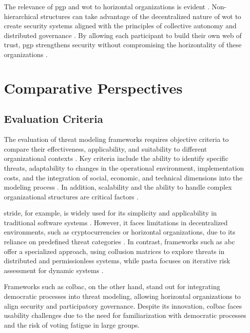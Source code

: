 The relevance of \gls{pgp} and \gls{wot} to horizontal organizations is evident
\cite{Colbac}. Non-hierarchical structures can take advantage of the
decentralized nature of \gls{wot} to create security systems aligned with the
principles of collective autonomy and distributed governance . By allowing each
participant to build their own web of trust, \gls{pgp} strengthens security
without compromising the horizontality of these organizations
\cite{EverydayRevolutions, Colbac}.

\section{Comparative Perspectives}
\label{sec:comparative_perspectives}

\subsection{Evaluation Criteria}
\label{subsec:evaluation_criteria}

The evaluation of threat modeling frameworks requires objective criteria to
compare their effectiveness, applicability, and suitability to different
organizational contexts \cite{EvaluationofCompetingThreatModeling}. Key criteria
include the ability to identify specific threats, adaptability to changes in the
operational environment, implementation costs, and the integration of social,
economic, and technical dimensions into the modeling process
\cite{ThreatModelingASystematicLiteratureReview}. In addition, scalability and
the ability to handle complex organizational structures are critical factors
\cite{AbcCrypto}.

\gls{stride}, for example, is widely used for its simplicity and applicability
in traditional software systems \cite{ThreatModelingdesigningForSecurity}.
However, it faces limitations in decentralized environments, such as
cryptocurrencies or horizontal organizations, due to its reliance on predefined
threat categories \cite{STRIDEthreatmodelingforcyberphysical}. In contrast,
frameworks such as \gls{abc} offer a specialized approach, using collusion
matrices to explore threats in distributed and permissionless systems, while
\gls{pasta} focuses on iterative risk assessment for dynamic systems
\cite{AbcCrypto, RiskCentricThreatModeling}.

Frameworks such as \gls{colbac}, on the other hand, stand out for integrating
democratic processes into threat modeling, allowing horizontal organizations to
align security and participatory governance. Despite its innovation,
\gls{colbac} faces usability challenges due to the need for familiarization with
democratic processes and the risk of voting fatigue in large groups.


